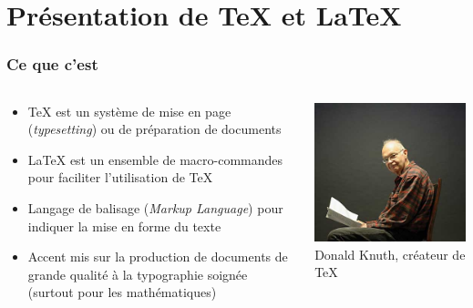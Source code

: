 
\section{Présentation de {\TeX} et {\LaTeX}}

\begin{frame}
  \frametitle{Ce que c'est}
  \begin{columns}
    \begin{column}{.5\textwidth}
      \begin{itemize}
      \item {\TeX} est un système de mise en page (\emph{typesetting})
        ou de préparation de documents
      \item {\LaTeX} est un ensemble de macro-commandes pour faciliter
        l'utilisation de {\TeX}
      \item Langage de balisage (\emph{Markup Language}) pour indiquer
        la mise en forme du texte
      \item Accent mis sur la production de documents de grande
        qualité à la typographie soignée (surtout pour les
        mathématiques)
      \end{itemize}
    \end{column}
    \begin{column}{.5\textwidth}
      \centering
      \includegraphics[width=\linewidth]{images/knuth} \\
      \footnotesize Donald Knuth, créateur de \TeX
    \end{column}
  \end{columns}
\end{frame}

